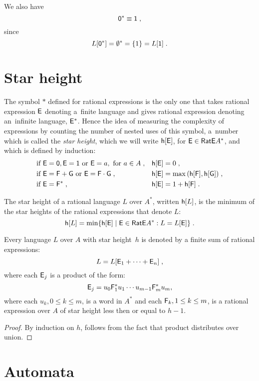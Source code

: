 We also have
\[
    {\mathsf{0}}^* \equiv {\mathsf{1}} \; ,
\]
since
\[
    L[{\mathsf{0}}^*] = \emptyset^* = \{ 1 \} = L[{\mathsf{1}}] \; .
\]

\section{Star height}

The symbol $*$ defined for rational expressions is the only one that takes rational expression ${\mathsf{E}}$ denoting a~finite language and gives rational expression denoting an~infinite language, ${\mathsf{E}}^*$. Hence the idea of measuring the complexity of expressions by counting the number of nested uses of this symbol, a~number which is called the \emph{star height}, which we will write ${\mathsf{h}[{\mathsf{E}}]}$, for ${\mathsf{E}} \in {\mathsf{RatE}} A^*$, and which is defined by induction:
\begin{align*}
    &\text{if } {\mathsf{E}} = {\mathsf{0}}, {\mathsf{E}} = {\mathsf{1}} \text{ or } {\mathsf{E}} = a, \text{ for } a \in A \; , & &{\mathsf{h}[{\mathsf{E}}]} = 0 \; , \\
    &\text{if } {\mathsf{E}} = {\mathsf{F}} + {\mathsf{G}} \text{ or } {\mathsf{E}} = {\mathsf{F}} \cdot {\mathsf{G}}\; , & &{\mathsf{h}[{\mathsf{E}}]} = \max{({\mathsf{h}[{\mathsf{F}}]}, {\mathsf{h}[{\mathsf{G}}]})} \; , \\
    &\text{if } {\mathsf{E}} = {\mathsf{F}}^* \; , & &{\mathsf{h}[{\mathsf{E}}]} = 1 + {\mathsf{h}[{\mathsf{F}}]} \; .
\end{align*}

The star height of a rational language $L$ over $A^*$, written ${\mathsf{h}[L]}$, is the minimum of the star heights of the rational expressions that denote $L$:
\[
    {\mathsf{h}[L]} = \min \{ {\mathsf{h}[{\mathsf{E}}]} \mid {\mathsf{E}} \in {\mathsf{RatE}} A^*: L = L[{\mathsf{E}}] \} \; .
\]

\begin{lemma}\label{lm:star_height_distributivity}
    Every language $L$ over $A$ with star height~$h$ is denoted by a finite sum of rational expressions:
    \[
        L = L[ {\mathsf{E}}_1 + \dotsb + {\mathsf{E}}_n ] \; ,
    \]
    where each ${\mathsf{E}}_j$ is a product of the form:
    \[
        {\mathsf{E}}_j = u_0{\mathsf{F}}_1^*u_1 \dotsm u_{m-1}{\mathsf{F}}_m^*u_m,
    \]
    where each $u_k, 0 \leq k \leq m$, is a word in $A^*$ and each ${\mathsf{F}}_k, 1 \leq k \leq m$, is a rational expression over $A$ of star height less then or equal to $h-1$.
\end{lemma}

\begin{proof}
    By induction on $h$, follows from the fact that product distributes over union.
\end{proof}

\section{Automata}

